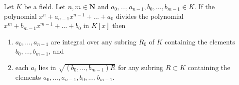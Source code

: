 \begin{lemma}
\label{editorial-source-lemma-polynomials-divide}
Let $K$ be a field. Let $n, m \in \mathbf{N}$ and
$a_0, \ldots, a_{n - 1}, b_0, \ldots, b_{m - 1} \in K$.
If the polynomial $x^n + a_{n - 1}x^{n - 1} + \ldots + a_0$
divides the polynomial $x^m + b_{m - 1} x^{m - 1} + \ldots + b_0$
in $K[x]$ then
\begin{enumerate}
\item $a_0, \ldots, a_{n - 1}$ are integral over any subring
$R_0$ of $K$ containing the elements $b_0, \ldots, b_{m - 1}$, and
\item each $a_i$ lies in $\sqrt{(b_0, \ldots, b_{m-1})R}$
for any subring $R \subset K$ containing the elements
$a_0, \ldots, a_{n - 1}, b_0, \ldots, b_{m - 1}$.
\end{enumerate}
\end{lemma}

